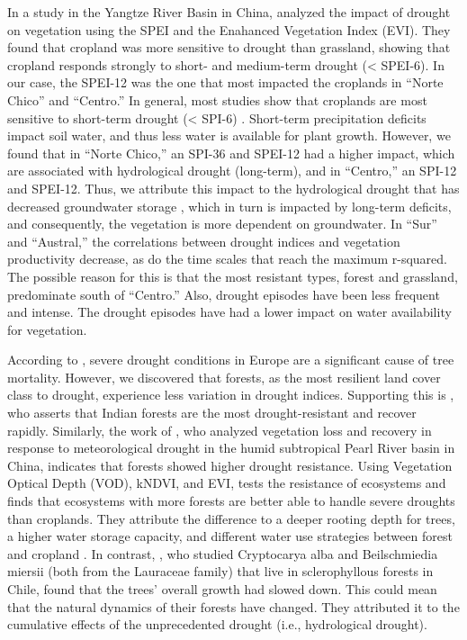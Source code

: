 \documentclass[
  authoryear,
  preprint,
  3p,
  onecolumn]{elsarticle}
\begin{document}
In a study in the Yangtze River Basin in China, \citet{Jiang2020}
analyzed the impact of drought on vegetation using the SPEI and the
Enahanced Vegetation Index (EVI). They found that cropland was more
sensitive to drought than grassland, showing that cropland responds
strongly to short- and medium-term drought (\textless{} SPEI-6). In our
case, the SPEI-12 was the one that most impacted the croplands in
``Norte Chico'' and ``Centro.'' In general, most studies show that
croplands are most sensitive to short-term drought (\textless{} SPI-6)
\citep{Zambrano2016, Potopova2015, Dai2020, Rhee2010}. Short-term
precipitation deficits impact soil water, and thus less water is
available for plant growth. However, we found that in ``Norte Chico,''
an SPI-36 and SPEI-12 had a higher impact, which are associated with
hydrological drought (long-term), and in ``Centro,'' an SPI-12 and
SPEI-12. Thus, we attribute this impact to the hydrological drought that
has decreased groundwater storage \citep{Taucare2024}, which in turn is
impacted by long-term deficits, and consequently, the vegetation is more
dependent on groundwater. In ``Sur'' and ``Austral,'' the correlations
between drought indices and vegetation productivity decrease, as do the
time scales that reach the maximum r-squared. The possible reason for
this is that the most resistant types, forest and grassland, predominate
south of ``Centro.'' Also, drought episodes have been less frequent and
intense. The drought episodes have had a lower impact on water
availability for vegetation.

According to \citet{Senf2020}, severe drought conditions in Europe are a
significant cause of tree mortality. However, we discovered that
forests, as the most resilient land cover class to drought, experience
less variation in drought indices. Supporting this is
\citet{Fathi-Taperasht2022}, who asserts that Indian forests are the
most drought-resistant and recover rapidly. Similarly, the work of
\citet{Wu2024}, who analyzed vegetation loss and recovery in response to
meteorological drought in the humid subtropical Pearl River basin in
China, indicates that forests showed higher drought resistance. Using
Vegetation Optical Depth (VOD), kNDVI, and EVI, \citet{Xiao2023} tests
the resistance of ecosystems and finds that ecosystems with more forests
are better able to handle severe droughts than croplands. They attribute
the difference to a deeper rooting depth for trees, a higher water
storage capacity, and different water use strategies between forest and
cropland \citep{Xiao2023}. In contrast, \citet{Venegas2022}, who studied
Cryptocarya alba and Beilschmiedia miersii (both from the Lauraceae
family) that live in sclerophyllous forests in Chile, found that the
trees' overall growth had slowed down. This could mean that the natural
dynamics of their forests have changed. They attributed it to the
cumulative effects of the unprecedented drought (i.e., hydrological
drought).
\end{document}
